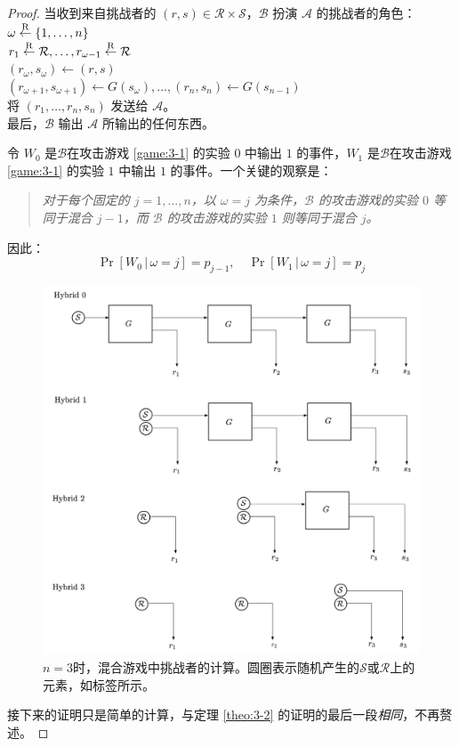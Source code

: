 \begin{proof}
\hspace*{5pt} 当收到来自挑战者的 $(r,s)\in\mathcal{R}\times\mathcal{S}$，$\mathcal B$ 扮演 $\mathcal A$ 的挑战者的角色：\\
\hspace*{50pt} $\omega\overset{\rm R}\leftarrow\{1,\dots,n\}$\\
\hspace*{50pt} $r_1\overset{\rm R}\leftarrow\mathcal R,\dots,r_{\omega-1}\overset{\rm R}\leftarrow\mathcal R$\\
\hspace*{50pt} $(r_{\omega},s_{\omega})\leftarrow(r,s)$\\
\hspace*{50pt} $(r_{\omega+1},s_{\omega+1})\leftarrow G(s_{\omega}),\dots,(r_n,s_n)\leftarrow G(s_{n-1})$\\
\hspace*{50pt} 将 $(r_1,\dots,r_n,s_n)$ 发送给 $\mathcal A$。\\
\hspace*{26pt} 最后，$\mathcal B$ 输出 $\mathcal A$ 所输出的任何东西。

\vspace*{5pt}

令 $W_0$ 是$\mathcal B$在攻击游戏 \ref{game:3-1} 的实验 $0$ 中输出 $1$ 的事件，$W_1$ 是$\mathcal B$在攻击游戏 \ref{game:3-1} 的实验 $1$ 中输出 $1$ 的事件。一个关键的观察是：
\begin{quote}
\emph{对于每个固定的 $j=1,\dots,n$，以 $\omega=j$ 为条件，$\mathcal B$ 的攻击游戏的实验 $0$ 等同于混合 $j-1$，而 $\mathcal B$ 的攻击游戏的实验 $1$ 则等同于混合 $j$。
}
\end{quote}
因此：
$$
\Pr[W_0\,|\,\omega=j]=p_{j-1},\quad
\Pr[W_1\,|\,\omega=j]=p_{j}
$$

\begin{figure}
  \centering
  \includegraphics[width=0.8\linewidth]{figures/chapter3/fig7.png}
  \caption{$n=3$时，混合游戏中挑战者的计算。圆圈表示随机产生的$\mathcal{S}$或$\mathcal{R}$上的元素，如标签所示。}
  \label{fig:3-7}
\end{figure}

接下来的证明只是简单的计算，与定理 \ref{theo:3-2} 的证明的最后一段\emph{相同}，不再赘述。
\end{proof}


